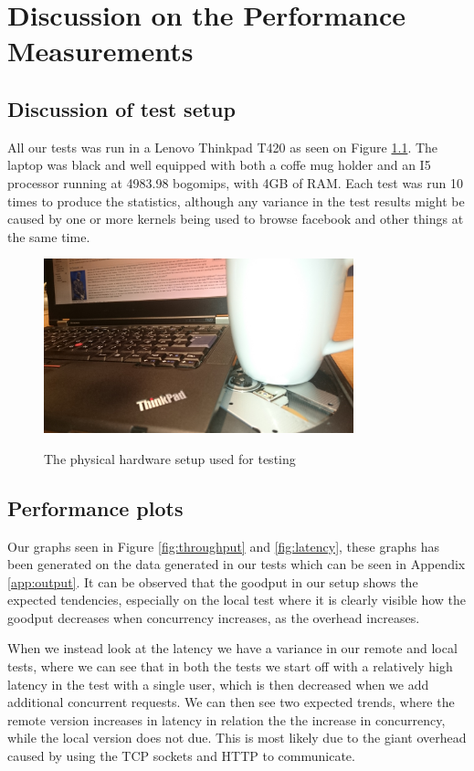 \chapter{Discussion on the Performance Measurements}
\section{Discussion of test setup}
All our tests was run in a Lenovo Thinkpad T420 as seen on Figure \ref{fig:hardware}. The laptop was black and well equipped with both a coffe mug holder and an I5 processor running at 4983.98 bogomips, with 4GB of RAM. Each test was run 10 times to produce the statistics, although any variance in the test results might be caused by one or more kernels being used to browse facebook and other things at the same time.

\begin{figure}[H]
    \centering
    \includegraphics[width=0.8\textwidth]{hardware.jpg}
    \label{fig:hardware}
    \caption{The physical hardware setup used for testing}
\end{figure}


\section{Performance plots}
Our graphs seen in Figure \ref{fig:throughput} and \ref{fig:latency}, these graphs has been generated on the data generated in our tests which can be seen in Appendix \ref{app:output}. It can be observed that the goodput in our setup shows the expected tendencies, especially on the local test where it is clearly visible how the goodput decreases when concurrency increases, as the overhead increases.

When we instead look at the latency we have a variance in our remote and local tests, where we can see that in both the tests we start off with a relatively high latency in the test with a single user, which is then decreased when we add additional concurrent requests. We can then see two expected trends, where the remote version increases in latency in relation the the increase in concurrency, while the local version does not due. This is most likely due to the giant overhead caused by using the TCP sockets and HTTP to communicate.

